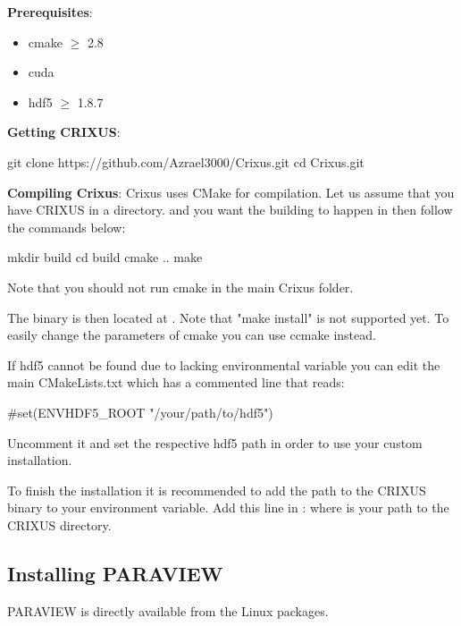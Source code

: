 \documentclass{../GPUSPHtemplate}
\begin{document}
\textbf{Prerequisites}:
\begin{itemize}
\item cmake $\ge$ 2.8
\item cuda
\item hdf5 $\ge$ 1.8.7
\end{itemize}

\textbf{Getting CRIXUS}:
\begin{shellcode}
git clone https://github.com/Azrael3000/Crixus.git
cd Crixus.git
\end{shellcode}

\textbf{Compiling Crixus}:
Crixus uses CMake for compilation. 
Let us assume that you have CRIXUS in a  directory. 
and you want the building to happen in  then follow the commands below:
\begin{shellcode}
mkdir build
cd build
cmake ..
make
\end{shellcode}
Note that you should not run cmake in the main Crixus folder.

The binary is then located at .
Note that "make install" is not supported yet. To easily change the parameters of cmake you can use ccmake instead.

If hdf5 cannot be found due to lacking environmental variable you can edit the main CMakeLists.txt which has a commented line that reads:
\begin{shellcode}
#set(ENV{HDF5_ROOT} "/your/path/to/hdf5")
\end{shellcode}
Uncomment it and set the respective hdf5 path in order to use your custom installation.

To finish the installation it is recommended to add the path to the CRIXUS binary to your
 environment variable. Add this line in :
where  is your path to the CRIXUS directory.

\subsection{Installing PARAVIEW}

PARAVIEW is directly available from the Linux packages.

\newpage
\appendixpage
\appendix



\end{document}
